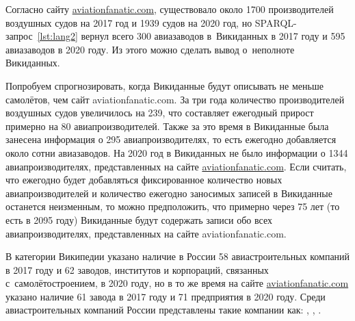 Согласно сайту \href{https://www.aviationfanatic.com/}{aviationfanatic.com}, 
существовало около \num{1700} производителей воздушных судов 
на 2017 год и 1939 судов на 2020 год\autocite{count_of_aircraft_manufactures}, 
но SPARQL-запрос~\ref{lst:lang2} вернул всего 300 авиазаводов в~Викиданных в 2017 году 
и 595 авиазаводов в 2020 году. Из этого можно сделать вывод о~неполноте Викиданных.  

Попробуем спрогнозировать, когда Викиданные будут описывать не меньше самолётов, 
чем сайт aviationfanatic.com. 
За три года количество производителей воздушных судов увеличилось на 239, 
что составляет ежегодный прирост примерно на 80 авиапроизводителей. 
Также за это время в Викиданные была занесена информация о 295 авиапроизводителях, 
то есть ежегодно добавляется около сотни авиазаводов. 
На 2020 год в Викиданных не было информации о \num{1344} авиапроизводителях, 
представленных на сайте \href{https://www.aviationfanatic.com/}{aviationfanatic.com}. 
Если считать, что ежегодно будет добавляться фиксированное количество новых авиапроизводителей 
и количество ежегодно заносимых записей в Викиданные останется неизменным, 
то можно предположить, что примерно через 75 лет (то есть в 2095 году) 
Викиданные будут содержать записи обо всех авиапроизводителях, представленных на сайте aviationfanatic.com.

В категории Википедии  указано наличие в России 58 авиастроительных компаний в 2017 году 
и 62 заводов, институтов и корпораций, связанных с~самолётостроением, в 2020 году, 
но в то же время на сайте \href{https://www.aviationfanatic.com/}{aviationfanatic.com} 
указано наличие 61 завода\autocite{count_plants_of_aircrafts} в 2017 году 
и 71 предприятия в 2020 году. 
Среди авиастроительных компаний России 
представлены такие компании как: , , .



